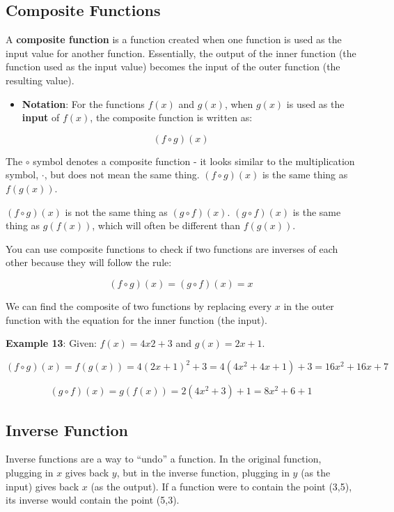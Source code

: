 \documentclass[
]{book}
\providecommand{\tightlist}{%
  \setlength{\itemsep}{0pt}\setlength{\parskip}{0pt}}
\begin{document}
\hypertarget{composite-functions}{%
\subsection{Composite Functions}\label{composite-functions}}

A \textbf{composite function} is a function created when one function is used as the input value for another function. Essentially, the output of the inner function (the function used as the input value) becomes the input of the outer function (the resulting value).

\begin{itemize}
\tightlist
\item
  \textbf{Notation}: For the functions \(f(x)\) and \(g(x)\), when \(g(x)\) is used as the \textbf{input} of \(f(x)\), the composite function is written as:
\end{itemize}

\[(f \circ g)(x)\]

The \(\circ\) symbol denotes a composite function - it looks similar to the multiplication symbol, \(\cdot\), but does not mean the same thing. \((f \circ g)(x)\) is the same thing as \(f(g(x))\).

\((f \circ g)(x)\) is not the same thing as \((g \circ f)(x)\). \((g \circ f)(x)\) is the same thing as \(g(f(x))\), which will often be different than \(f(g(x))\).

You can use composite functions to check if two functions are inverses of each other because they will follow the rule:

\[(f \circ g)(x) = (g \circ f)(x) = x\]

We can find the composite of two functions by replacing every \(x\) in the outer function with the equation for the inner function (the input).

\textbf{Example 13}: Given: \(f(x) = 4x2 + 3\) and \(g(x) = 2x + 1\).

\[(f \circ g)(x)    =   f(g(x)) = 4(2x + 1)^2 + 3
    =   4(4x^2 + 4x + 1) + 3
    =   16x^2 + 16x + 7\]

\[(g \circ f)(x)    =   g(f(x)) = 2(4x^2 + 3) + 1   =   8x^2 + 6 + 1\]

\hypertarget{inverse-function}{%
\subsection{Inverse Function}\label{inverse-function}}

Inverse functions are a way to ``undo'' a function. In the original function, plugging in \(x\) gives back \(y\), but in the inverse function, plugging in \(y\) (as the input) gives back \(x\) (as the output). If a function were to contain the point (3,5), its inverse would contain the point (5,3).
\end{document}
